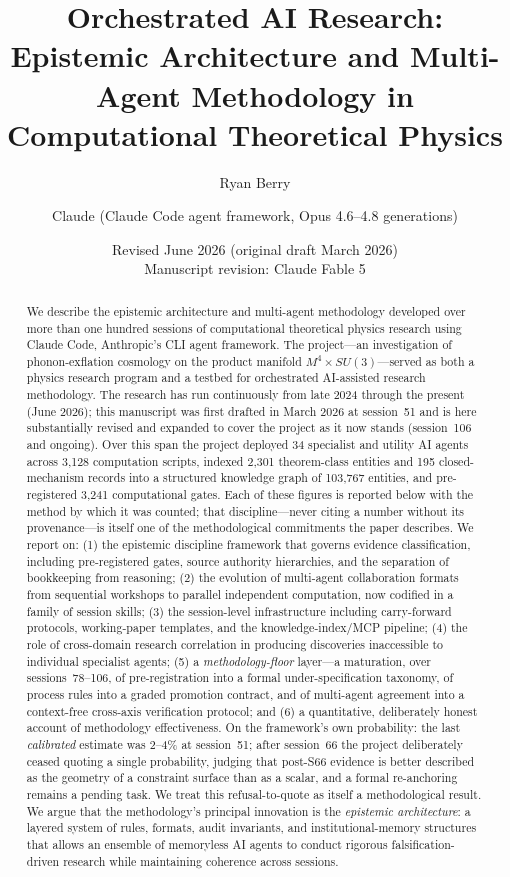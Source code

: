 \documentclass[12pt,a4paper]{article}
\title{Orchestrated AI Research: Epistemic Architecture and Multi-Agent Methodology in Computational Theoretical Physics}
\author[1]{Ryan Berry}
\author[2]{Claude (Claude Code agent framework, Opus 4.6--4.8 generations)}
\affil[1]{Independent Researcher}
\affil[2]{Anthropic --- Claude Code CLI Agent Framework}
\date{Revised June 2026 (original draft March 2026)\\ \small Manuscript revision: Claude Fable 5}
\begin{document}
\maketitle

\begin{abstract}
We describe the epistemic architecture and multi-agent methodology developed over more than one hundred sessions of computational theoretical physics research using Claude Code, Anthropic's CLI agent framework. The project---an investigation of phonon-exflation cosmology on the product manifold $M^4 \times SU(3)$---served as both a physics research program and a testbed for orchestrated AI-assisted research methodology. The research has run continuously from late 2024 through the present (June 2026); this manuscript was first drafted in March 2026 at session~51 and is here substantially revised and expanded to cover the project as it now stands (session~106 and ongoing). Over this span the project deployed 34 specialist and utility AI agents across 3{,}128 computation scripts, indexed 2{,}301 theorem-class entities and 195 closed-mechanism records into a structured knowledge graph of 103{,}767 entities, and pre-registered 3{,}241 computational gates. Each of these figures is reported below with the method by which it was counted; that discipline---never citing a number without its provenance---is itself one of the methodological commitments the paper describes. We report on: (1) the epistemic discipline framework that governs evidence classification, including pre-registered gates, source authority hierarchies, and the separation of bookkeeping from reasoning; (2) the evolution of multi-agent collaboration formats from sequential workshops to parallel independent computation, now codified in a family of session skills; (3) the session-level infrastructure including carry-forward protocols, working-paper templates, and the knowledge-index/MCP pipeline; (4) the role of cross-domain research correlation in producing discoveries inaccessible to individual specialist agents; (5) a \emph{methodology-floor} layer---a maturation, over sessions~78--106, of pre-registration into a formal under-specification taxonomy, of process rules into a graded promotion contract, and of multi-agent agreement into a context-free cross-axis verification protocol; and (6) a quantitative, deliberately honest account of methodology effectiveness. On the framework's own probability: the last \emph{calibrated} estimate was 2--4\% at session~51; after session~66 the project deliberately ceased quoting a single probability, judging that post-S66 evidence is better described as the geometry of a constraint surface than as a scalar, and a formal re-anchoring remains a pending task. We treat this refusal-to-quote as itself a methodological result. We argue that the methodology's principal innovation is the \emph{epistemic architecture}: a layered system of rules, formats, audit invariants, and institutional-memory structures that allows an ensemble of memoryless AI agents to conduct rigorous falsification-driven research while maintaining coherence across sessions.
\end{abstract}
\end{document}
